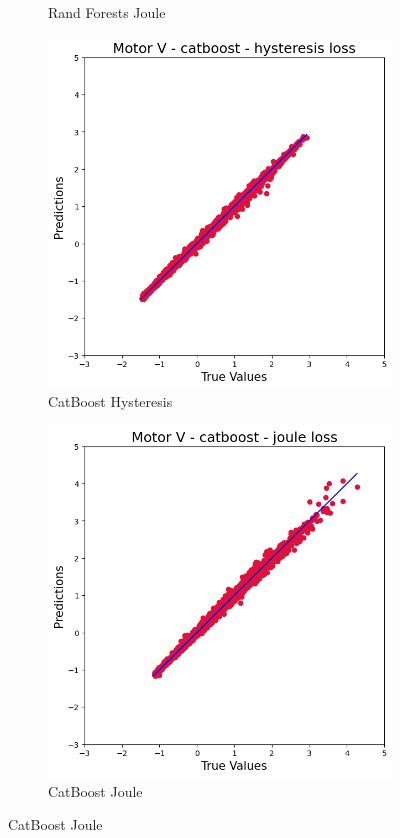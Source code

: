 \documentclass{article}
\begin{document}
\begin{figure}[!htbp]
\begin{subfigure}[b]{0.23\textwidth}
        \caption{Rand Forests Joule}
    \end{subfigure}
    \hfill
    \begin{subfigure}[b]{0.23\textwidth}
        \centering
        \includegraphics[width=\textwidth]{images/V/catboost_hysteresis.png}
        \caption{CatBoost Hysteresis}
    \end{subfigure}
    \hfill
    \begin{subfigure}[b]{0.23\textwidth}
        \centering
        \includegraphics[width=\textwidth]{images/V/catboost_joule.png}
        \caption{CatBoost Joule}
    \end{subfigure}
    

\end{figure}
\end{document}
